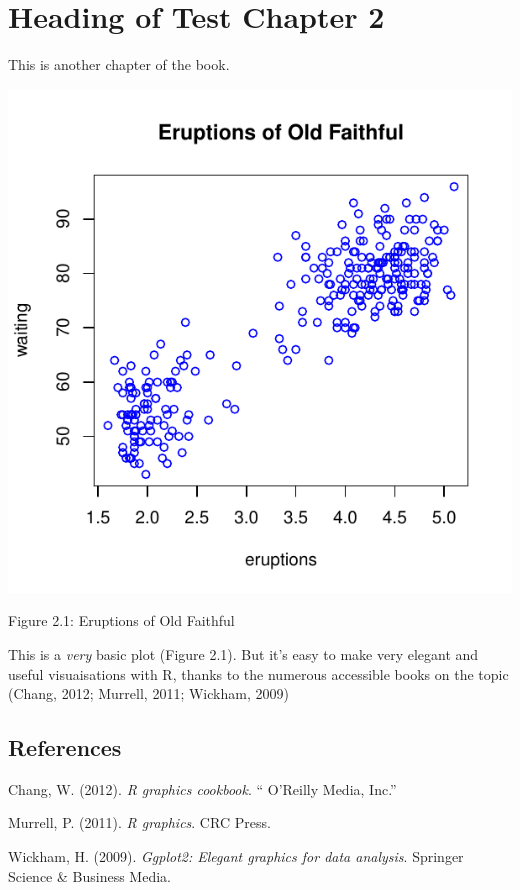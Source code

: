 \chapter{Heading of Test Chapter 2}\label{testchaptertwo}

This is another chapter of the book.

\begin{Shaded}
\begin{Highlighting}[]
 \NormalTok{, } \NormalTok{)}
\end{Highlighting}
\end{Shaded}

\includegraphics{figures/old_faithful-1.pdf}

Figure 2.1: Eruptions of Old Faithful

This is a \emph{very} basic plot (Figure 2.1). But it's easy to make
very elegant and useful visuaisations with R, thanks to the numerous
accessible books on the topic (Chang, 2012; Murrell, 2011; Wickham,
2009)

\section*{References}

Chang, W. (2012). \emph{R graphics cookbook}. `` O'Reilly Media, Inc.''

Murrell, P. (2011). \emph{R graphics}. CRC Press.

Wickham, H. (2009). \emph{Ggplot2: Elegant graphics for data analysis}.
Springer Science \& Business Media.
